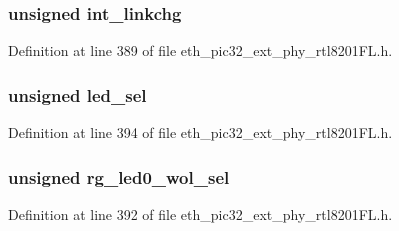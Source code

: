 \subsubsection[{int\+\_\+linkchg}]{\setlength{\rightskip}{0pt plus 5cm}unsigned int\+\_\+linkchg}\label{union___i_n_t___w_o_l___l_e_d_s__t_a386b3fd5b40085ce0114845fe40bcd75}


Definition at line 389 of file eth\+\_\+pic32\+\_\+ext\+\_\+phy\+\_\+rtl8201\+F\+L.\+h.

\hypertarget{union___i_n_t___w_o_l___l_e_d_s__t_a0d0c6712d24dba9817cb9dab5f05d11b}{}
\subsubsection[{led\+\_\+sel}]{\setlength{\rightskip}{0pt plus 5cm}unsigned led\+\_\+sel}\label{union___i_n_t___w_o_l___l_e_d_s__t_a0d0c6712d24dba9817cb9dab5f05d11b}


Definition at line 394 of file eth\+\_\+pic32\+\_\+ext\+\_\+phy\+\_\+rtl8201\+F\+L.\+h.

\hypertarget{union___i_n_t___w_o_l___l_e_d_s__t_a2b8b02a6fc25bd1ae158cc0e124d5734}{}
\subsubsection[{rg\+\_\+led0\+\_\+wol\+\_\+sel}]{\setlength{\rightskip}{0pt plus 5cm}unsigned rg\+\_\+led0\+\_\+wol\+\_\+sel}\label{union___i_n_t___w_o_l___l_e_d_s__t_a2b8b02a6fc25bd1ae158cc0e124d5734}


Definition at line 392 of file eth\+\_\+pic32\+\_\+ext\+\_\+phy\+\_\+rtl8201\+F\+L.\+h.

\hypertarget{union___i_n_t___w_o_l___l_e_d_s__t_a160850a4684a3e82c2323033964f2e98}{}
